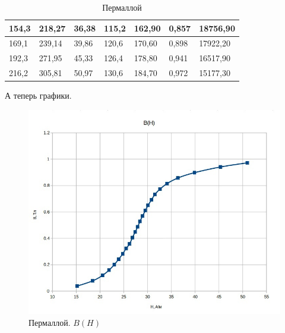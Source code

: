\documentclass[a4paper,12pt]{article} %
\begin{document}
\begin{table}[h!]
\begin{tabular}{|l|l|l|l|l|l|l|}
		154,3                                     & 218,27                                                  & 36,38                                                 & 115,2                                    & 162,90                                                  & 0,857                        & 18756,90                                        \\ \hline
		169,1                                     & 239,14                                                  & 39,86                                                 & 120,6                                    & 170,60                                                  & 0,898                        & 17922,20                                        \\ \hline
		192,3                                     & 271,95                                                  & 45,33                                                 & 126,4                                    & 178,80                                                  & 0,941                        & 16517,90                                        \\ \hline
		216,2                                     & 305,81                                                  & 50,97                                                 & 130,6                                    & 184,70                                                  & 0,972                        & 15177,30                                        \\ \hline
	\end{tabular}
	\caption{Пермаллой}
\end{table}

\newpage
А теперь графики.
\begin{figure}[h!]
	\centering
	\includegraphics[scale=0.45]{Pictures/ПЕРМАЛЛОЙ_B(H).jpg}
	\caption{Пермаллой. $B(H)$}
\end{figure}
\end{document}
